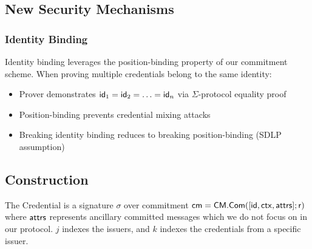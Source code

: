 \subsection{New Security Mechanisms}

\subsubsection{Identity Binding}
Identity binding leverages the position-binding property of our commitment scheme. When proving multiple credentials belong to the same identity:
\begin{itemize}
    \item Prover demonstrates $\mathsf{id}_1 = \mathsf{id}_2 = \ldots = \mathsf{id}_n$ via $\Sigma$-protocol equality proof
    \item Position-binding prevents credential mixing attacks
    \item Breaking identity binding reduces to breaking position-binding (SDLP assumption)
\end{itemize}



\newpage
\subsection{\MIMCABC Construction}
The Credential is a signature $\sigma$ over commitment $\mathsf{cm} = \mathsf{CM.Com}([\mathsf{id}, \mathsf{ctx}, \mathsf{attrs}]; \mathsf{r})$ where $\mathsf{attrs}$ represents ancillary committed messages which we do not focus on in our protocol. $j$ indexes the issuers, and $k$ indexes the credentials from a specific issuer. 

